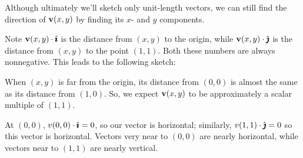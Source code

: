 \begin{solution}

Although ultimately we'll sketch only unit-length vectors, we can still find the direction of $\mathbf{v}(x,y)$ by finding its $x$- and $y$ components.

Note $\mathbf{v}(x,y)\cdot \hat{\pmb{\imath}}$ is the distance from $(x,y)$ to the origin, while $\mathbf{v}(x,y)\cdot\hat{\pmb{\jmath}}$ is the distance from $(x,y)$ to the point $(1,1)$. Both these numbers are always nonnegative. This leads to the following sketch:

\begin{center}
\end{center}

When $(x,y)$ is far from the origin, its distance from $(0,0)$ is almost the same as its distance from $(1,0)$. So, we expect $\mathbf{v}(x,y)$ to be approximately a scalar multiple of $(1,1)$. 

At $(0,0)$, $v(0,0)\cdot \hat{\pmb{\imath}}=0$, so our vector is horizontal; similarly, $v(1,1)\cdot\hat{\pmb{\jmath}}=0$ so this vector is horizontal. Vectors very near to $(0,0)$ are nearly horizontal, while vectors near to $(1,1)$ are nearly vertical.



\begin{center}
\end{center}
\end{solution}
